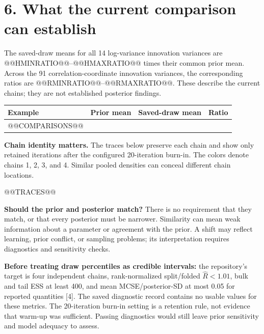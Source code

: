\documentclass[10pt,a4paper]{article}
\begin{document}
\clearpage
\section*{6. What the current comparison can establish}
The saved-draw means for all 14 log-variance innovation variances are
@@HMINRATIO@@--@@HMAXRATIO@@ times their common prior mean. Across the 91 correlation-coordinate
innovation variances, the corresponding ratios are @@RMINRATIO@@--@@RMAXRATIO@@.
These describe the current chains; they are not established posterior findings.
\begin{center}\small
\begin{tabular}{lrrr}\toprule
Example & Prior mean & Saved-draw mean & Ratio\\\midrule
@@COMPARISONS@@
\bottomrule\end{tabular}\end{center}
\textbf{Chain identity matters.} The traces below preserve each chain and show only retained
iterations after the configured 20-iteration burn-in. The colors denote chains
\textcolor{chainone}{1}, \textcolor{chaintwo}{2}, \textcolor{chainthree}{3}, and
\textcolor{chainfour}{4}. Similar pooled densities can conceal different chain locations.
\par\smallskip
@@TRACES@@
\par\smallskip
\textbf{Should the prior and posterior match?} There is no requirement that they match,
or that every posterior must be narrower. Similarity can mean weak information about a
parameter or agreement with the prior. A shift may reflect learning, prior conflict, or
sampling problems; its interpretation requires diagnostics and sensitivity checks.

\textbf{Before treating draw percentiles as credible intervals:} the repository's target
is four independent chains, rank-normalized split/folded $\widehat R<1.01$, bulk and tail
ESS at least 400, and mean MCSE/posterior-SD at most 0.05 for reported quantities [4].
The saved diagnostic record contains no usable values for these metrics. The 20-iteration
burn-in setting is a retention rule, not evidence that warm-up was sufficient. Passing
diagnostics would still leave prior sensitivity and model adequacy to assess.

\clearpage
\end{document}
